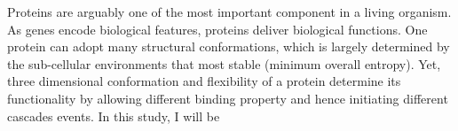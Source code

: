 Proteins are arguably one of the most important component in a living organism. As genes encode biological features, proteins deliver biological functions. One protein can adopt many structural conformations, which is largely determined by the sub-cellular environments that most stable (minimum overall entropy). Yet, three dimensional conformation and flexibility of a protein determine its functionality by allowing different binding property and hence initiating different cascades events. In this study, I will be 